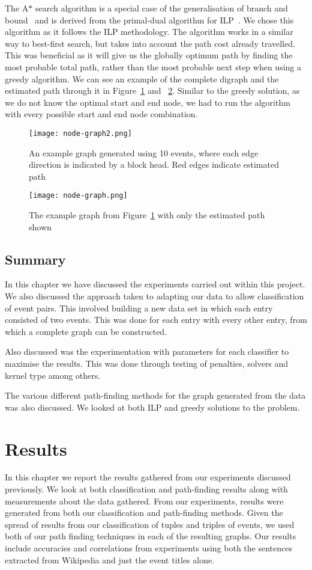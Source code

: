 \documentclass[bsc,frontabs,twoside,singlespacing,parskip,deptreport]{infthesis}     %
\begin{document}
The A$*$ search algorithm is a special case of the generalisation of branch and bound~\cite{balas1983branch} and is derived from the primal-dual algorithm for ILP~\cite{ye2012note}.
We chose this algorithm as it follows the ILP methodology. The algorithm works in a similar way to best-first search, but takes into account the path cost already travelled.
This was beneficial as it will give us the globally optimum path by finding the most probable total path, rather than the most probable next step when using a
greedy algorithm. We can see an example of the complete digraph and the estimated path through it in Figure~\ref{fig:minigraph} and ~\ref{fig:minigraph-clean}.
Similar to the greedy solution, as we do not know the optimal start and end node, we had to run the algorithm with every possible start and end node combination.
\begin{figure}[H]
\centering
  \centering
  \texttt{[image: node-graph2.png]}
  \caption{An example graph generated using 10 events, where each edge direction is indicated by a block head. Red edges indicate estimated path}
  \label{fig:minigraph}
\end{figure}
\begin{figure}[H]
  \centering
  \texttt{[image: node-graph.png]}
\caption{The example graph from Figure~\ref{fig:minigraph} with only the estimated path shown }
\label{fig:minigraph-clean}
\end{figure}

\section{Summary}
In this chapter we have discussed the experiments carried out within this project.
We also discussed the approach taken to adapting our data to allow classification of event pairs. This involved building a new data set
in which each entry consisted of two events. This was done for each entry with every other entry, from which a complete
graph can be constructed.

Also discussed was the experimentation with parameters for each classifier to maximise the results. This was done through
testing of penalties, solvers and kernel type among others.

The various different path-finding methods for the graph generated from the data was also discussed.
We looked at both ILP and greedy solutions to the problem.

\chapter{Results}\label{chapter:results}
In this chapter we report the results gathered from our experiments discussed previously.
We look at both classification and path-finding results along with measurements about the data gathered.
From our experiments, results were generated from both our classification and path-finding methods.
Given the spread of results from our classification of tuples and triples of events, we used both of our path finding
techniques in each of the resulting graphs. Our results include accuracies and correlations from
experiments using both the sentences extracted from Wikipedia and just the event titles alone.   
\end{document}
